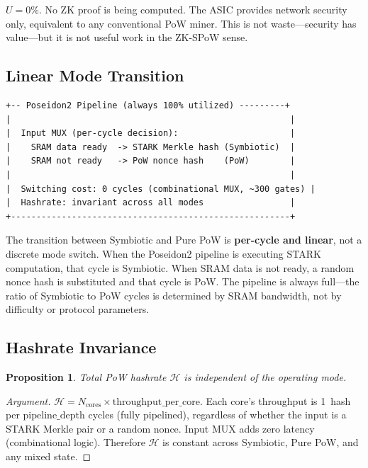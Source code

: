 \documentclass[11pt,a4paper]{article}
\newtheorem{proposition}{Proposition}
\begin{document}
$U = 0\%$. No ZK proof is being computed. The ASIC provides network security only, equivalent to any conventional PoW miner. This is not waste---security has value---but it is not useful work in the ZK-SPoW sense.

\subsection{Linear Mode Transition}

\begin{Verbatim}[fontsize=\small]
+-- Poseidon2 Pipeline (always 100% utilized) ---------+
|                                                       |
|  Input MUX (per-cycle decision):                      |
|    SRAM data ready  -> STARK Merkle hash (Symbiotic)  |
|    SRAM not ready   -> PoW nonce hash    (PoW)        |
|                                                       |
|  Switching cost: 0 cycles (combinational MUX, ~300 gates) |
|  Hashrate: invariant across all modes                 |
+-------------------------------------------------------+
\end{Verbatim}

The transition between Symbiotic and Pure PoW is \textbf{per-cycle and linear}, not a discrete mode switch. When the Poseidon2 pipeline is executing STARK computation, that cycle is Symbiotic. When SRAM data is not ready, a random nonce hash is substituted and that cycle is PoW. The pipeline is always full---the ratio of Symbiotic to PoW cycles is determined by SRAM bandwidth, not by difficulty or protocol parameters.

\subsection{Hashrate Invariance}

\begin{proposition}
Total PoW hashrate $\mathcal{H}$ is independent of the operating mode.
\end{proposition}
\begin{proof}[Argument]
$\mathcal{H} = N_{\mathrm{cores}} \times \mathrm{throughput\_per\_core}$. Each core's throughput is 1~hash per $\mathrm{pipeline\_depth}$ cycles (fully pipelined), regardless of whether the input is a STARK Merkle pair or a random nonce. Input MUX adds zero latency (combinational logic). Therefore $\mathcal{H}$ is constant across Symbiotic, Pure PoW, and any mixed state.
\end{proof}
\end{document}
